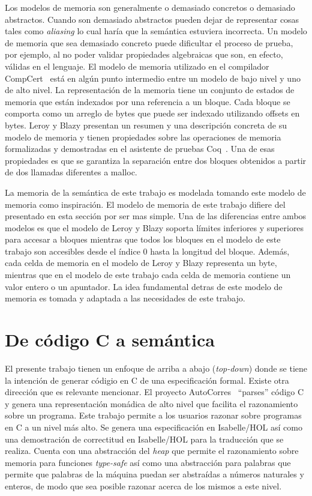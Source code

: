 Los modelos de memoria son generalmente o demasiado concretos o demasiado abstractos.
Cuando son demasiado abstractos pueden dejar de representar cosas tales como \textit{aliasing} lo cual haría que la semántica estuviera incorrecta.
Un modelo de memoria que sea demasiado concreto puede dificultar el proceso de prueba, por ejemplo, al no poder validar propiedades algebraicas que son, en efecto, válidas en el lenguaje.
El modelo de memoria utilizado en el compilador CompCert~\cite{leroy-blazy-memory-model} está en algún punto intermedio entre un modelo de bajo nivel y uno de alto nivel.
La representación de la memoria tiene un conjunto de estados de memoria que están indexados por una referencia a un bloque.
Cada bloque se comporta como un arreglo de bytes que puede ser indexado utilizando offsets en bytes.
Leroy y Blazy presentan un resumen y una descripción concreta de su modelo de memoria y tienen propiedades sobre las operaciones de memoria formalizadas y demostradas en el asistente de pruebas Coq~\cite{coq-doc}.
Una de esas propiedades es que se garantiza la separación entre dos bloques obtenidos a partir de dos llamadas diferentes a malloc.

La memoria de la semántica de este trabajo es modelada tomando este modelo de memoria como inspiración.
El modelo de memoria de este trabajo difiere del presentado en esta sección por ser mas simple.
Una de las diferencias entre ambos modelos es que el modelo de Leroy y Blazy soporta límites inferiores y superiores para accesar a bloques mientras que todos los bloques en el modelo de este trabajo son accesibles desde el índice $0$ hasta la longitud del bloque.
Además, cada celda de memoria en el modelo de Leroy y Blazy representa un byte, mientras que en el modelo de este trabajo cada celda de memoria contiene un valor entero o un apuntador.
La idea fundamental detras de este modelo de memoria es tomada y adaptada a las necesidades de este trabajo.


\section{De código C a semántica}

El presente trabajo tienen un enfoque de arriba a abajo (\textit{top-down}) donde se tiene la intención de generar códigio en C de una especificación formal.
Existe otra dirección que es relevante mencionar.
El proyecto AutoCorres~\cite{autocorres} ``parses'' código C y genera una representación monádica de alto nivel que facilita el razonamiento sobre un programa.
Este trabajo permite a los usuarios razonar sobre programas en C a un nivel más alto.
Se genera una especificación en Isabelle/HOL así como una demostración de correctitud en Isabelle/HOL para la traducción que se realiza.
Cuenta con una abstracción del \textit{heap} que permite el razonamiento sobre memoria para funciones \textit{type-safe} así como una abstracción para palabras que permite que palabras de la máquina puedan ser abstraídas a números naturales y enteros, de modo que sea posible razonar acerca de los mismos a este nivel.

